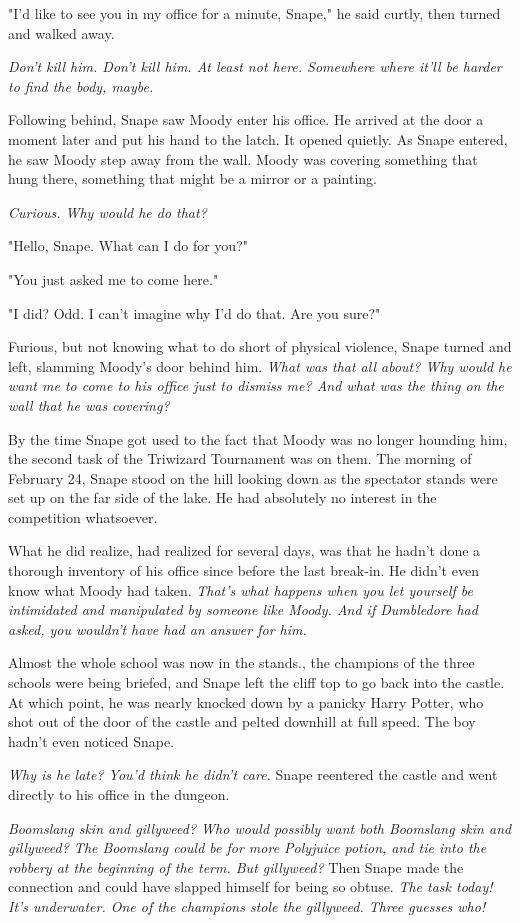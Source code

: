 \documentclass[a4paper,11pt]{article}
\begin{document}
"I'd like to see you in my office for a minute, Snape," he said curtly, then turned and walked away.

\emph{Don't kill him. Don't kill him. At least not here. Somewhere where it'll be harder to find the body, maybe.}

Following behind, Snape saw Moody enter his office. He arrived at the door a moment later and put his hand to the latch. It opened quietly. As Snape entered, he saw Moody step away from the wall. Moody was covering something that hung there, something that might be a mirror or a painting.

\emph{Curious. Why would he do that?}

"Hello, Snape. What can I do for you?"

"You just asked me to come here."

"I did? Odd. I can't imagine why I'd do that. Are you sure?"

Furious, but not knowing what to do short of physical violence, Snape turned and left, slamming Moody's door behind him. \emph{What was that all about? Why would he want me to come to his office just to dismiss me? And what was the thing on the wall that he was covering?}

By the time Snape got used to the fact that Moody was no longer hounding him, the second task of the Triwizard Tournament was on them. The morning of February 24, Snape stood on the hill looking down as the spectator stands were set up on the far side of the lake. He had absolutely no interest in the competition whatsoever.

What he did realize, had realized for several days, was that he hadn't done a thorough inventory of his office since before the last break-in. He didn't even know what Moody had taken. \emph{That's what happens when you let yourself be intimidated and manipulated by someone like Moody. And if Dumbledore had asked, you wouldn't have had an answer for him.}

Almost the whole school was now in the stands., the champions of the three schools were being briefed, and Snape left the cliff top to go back into the castle. At which point, he was nearly knocked down by a panicky Harry Potter, who shot out of the door of the castle and pelted downhill at full speed. The boy hadn't even noticed Snape.

\emph{Why is he late? You'd think he didn't care.} Snape reentered the castle and went directly to his office in the dungeon.

\emph{Boomslang skin and gillyweed? Who would possibly want both Boomslang skin and gillyweed? The Boomslang could be for more Polyjuice potion, and tie into the robbery at the beginning of the term. But gillyweed?} Then Snape made the connection and could have slapped himself for being so obtuse. \emph{The task today! It's underwater. One of the champions stole the gillyweed. Three guesses who!}
\end{document}

